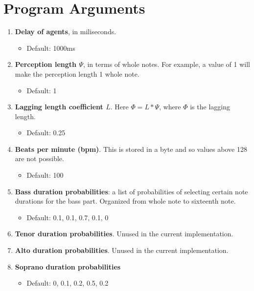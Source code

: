 \documentclass[12pt]{article}
\begin{document}
	\section{Program Arguments}
	\label{sec:args}
	\begin{enumerate}
		\item {\bf Delay of agents}, in miliseconds.
		\begin{itemize}
			\item Default: 1000ms
		\end{itemize}
	
		\item {\bf Perception length $\Psi$}, in terms of whole notes. For example, a value of 1 will make the perception length 1 whole note.
		\begin{itemize}
			\item Default: 1
		\end{itemize}
	
		\item {\bf Lagging length coefficient $L$}. Here $\Phi = L * \Psi$, where $\Phi$ is the lagging length. 
		\begin{itemize}
			\item Default: 0.25
		\end{itemize}
		
		\item {\bf Beats per minute (bpm)}. This is stored in a byte and so values above 128 are not possible.
		\begin{itemize}
			\item Default: 100
		\end{itemize}
	
		\item {\bf Bass duration probabilities}: a list of probabilities of selecting certain note durations for the bass part. Organized from whole note to sixteenth note.
		\begin{itemize}
			\item Default: 0.1, 0.1, 0.7, 0.1, 0
		\end{itemize}
	
		\item {\bf Tenor duration probabilities}. Unused in the current implementation.
		\item {\bf Alto duration probabilities}. Unused in the current implementation.
		
		\item {\bf Soprano duration probabilities}
		\begin{itemize}
			\item Default: 0, 0.1, 0.2, 0.5, 0.2
		\end{itemize}
	

\end{enumerate}
\end{document}
